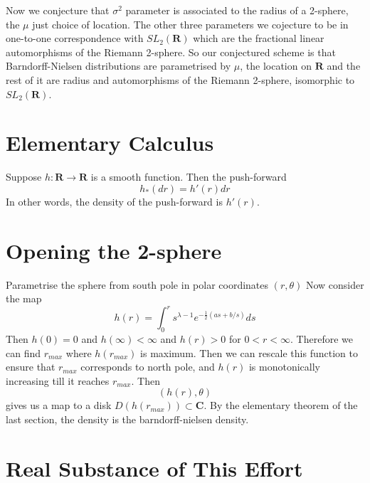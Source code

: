 \documentclass{amsart}
\begin{document}
Now we conjecture that $\sigma^2$ parameter is associated to the radius of a 2-sphere, the $\mu$ just choice of location.  The other three parameters we cojecture to be in one-to-one correspondence with $SL_2(\mathbf{R})$ which are the fractional linear automorphisms of the Riemann 2-sphere.  So our conjectured scheme is that Barndorff-Nielsen distributions are parametrised by $\mu$, the location on $\mathbf{R}$ and the rest of it are radius and automorphisms of the Riemann 2-sphere, isomorphic to $SL_2(\mathbf{R})$.

\section{Elementary Calculus}

Suppose $h: \mathbf{R}\rightarrow\mathbf{R}$ is a smooth function.  Then the push-forward 
\[
h_*( dr ) = h'(r) dr
\]
In other words, the density of the push-forward is $h'(r)$.


\section{Opening the 2-sphere}

Parametrise the sphere from south pole in polar coordinates $(r,\theta)$ Now consider the map
\[
h(r) = \int_{0}^{r} s^{\lambda-1} e^{-\frac{1}{2}( as + b/s)} ds
\]
Then $h(0)= 0$ and $h(\infty)<\infty$ and $h(r)>0$ for 
$0<r<\infty$.
Therefore we can find $r_{max}$ where $h(r_{max})$ is maximum.  Then we can rescale this function to ensure that $r_{max}$ corresponds to north pole, and $h(r)$ is monotonically increasing till it reaches $r_{max}$.  Then 
\[
(h(r),\theta)
\]
gives us a map to a disk $D( h(r_{max})) \subset \mathbf{C}$.  By the elementary theorem of the last section, the density is the barndorff-nielsen density.

\section{Real Substance of This Effort}
\end{document}

